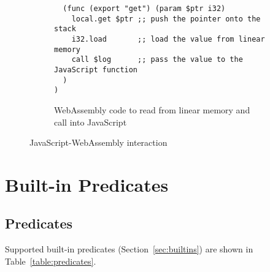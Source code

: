 \begin{appendices}
\begin{figure}[H]
\begin{subfigure}{\textwidth}
\begin{verbatim}
  (func (export "get") (param $ptr i32)
    local.get $ptr ;; push the pointer onto the stack
    i32.load       ;; load the value from linear memory
    call $log      ;; pass the value to the JavaScript function
  )
)
\end{verbatim}
\caption{WebAssembly code to read from linear memory and call into JavaScript}
\end{subfigure}
\caption{JavaScript-WebAssembly interaction}
\label{fig:js-wasm}
\end{figure}

\chapter{Built-in Predicates}

\label{appendix:predicates}

\section{Predicates}

Supported built-in predicates (Section~\ref{sec:builtins}) are shown in Table~\ref{table:predicates}.


\end{appendices}
